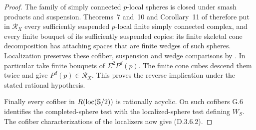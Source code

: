 \begin{proof}
The family of simply connected $p$-local spheres is
closed under smash products and suspension. Theorems~7
and~10 and Corollary~11 of \cite{I_Strom2012} therefore
put in $\mathcal R_X$ every sufficiently suspended
$p$-local finite simply connected complex, and every
finite bouquet of its sufficiently suspended copies:
its finite skeletal cone decomposition has attaching
spaces that are finite wedges of such spheres.
Localization preserves these cofiber, suspension and
wedge comparisons by
\cite[Propositions~6.4.1--6.4.6]{FGHMayPonto2012}.
In particular take finite bouquets of $\Sigma^2P^d(p)$.
The finite cone cubes descend them twice and give
$P^d(p)\in\mathcal R_X$.
This proves the reverse implication under the stated
rational hypothesis.

Finally every cofiber in $R(\operatorname{loc}(\mathbb S/2))$ is
rationally acyclic. On such cofibers G.6 identifies the
completed-sphere test with the localized-sphere test
defining $W_S$. The cofiber characterizations of the
localizers now give (D.3.6.2).
\end{proof}
